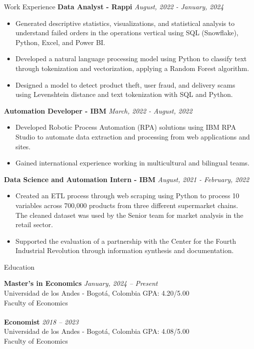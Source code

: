 \documentclass{resume}
\begin{document}
\begin{rSection}{Work Experience}
{\bf Data Analyst - Rappi} \hfill {\em August, 2022 - January, 2024} 
\begin{itemize}
    \item Generated descriptive statistics, visualizations, and statistical analysis to understand failed orders in the operations vertical using SQL (Snowflake), Python, Excel, and Power BI.
    \item Developed a natural language processing model using Python to classify text through tokenization and vectorization, applying a Random Forest algorithm.
    \item Designed a model to detect product theft, user fraud, and delivery scams using Levenshtein distance and text tokenization with SQL and Python.
\end{itemize}

{\bf Automation Developer - IBM} \hfill {\em March, 2022 - August, 2022} 
\begin{itemize}
    \item Developed Robotic Process Automation (RPA) solutions using IBM RPA Studio to automate data extraction and processing from web applications and sites.
    \item Gained international experience working in multicultural and bilingual teams.
\end{itemize}

{\bf Data Science and Automation Intern - IBM} \hfill {\em August, 2021 - February, 2022} 
\begin{itemize}
    \item Created an ETL process through web scraping using Python to process 10 variables across 700,000 products from three different supermarket chains. The cleaned dataset was used by the Senior team for market analysis in the retail sector.
    \item Supported the evaluation of a partnership with the Center for the Fourth Industrial Revolution through information synthesis and documentation.
\end{itemize}
\end{rSection}

\begin{rSection}{Education}

{\bf Master's in Economics} \hfill {\em January, 2024 – Present} 
\\ Universidad de los Andes - Bogotá, Colombia \hfill 
{ GPA: 4.20/5.00}
\\ Faculty of Economics
\\
\\{\bf Economist} \hfill {\em 2018 – 2023} 
\\ Universidad de los Andes - Bogotá, Colombia \hfill { GPA: 4.08/5.00}
\\ Faculty of Economics
\end{rSection}
\end{document}
